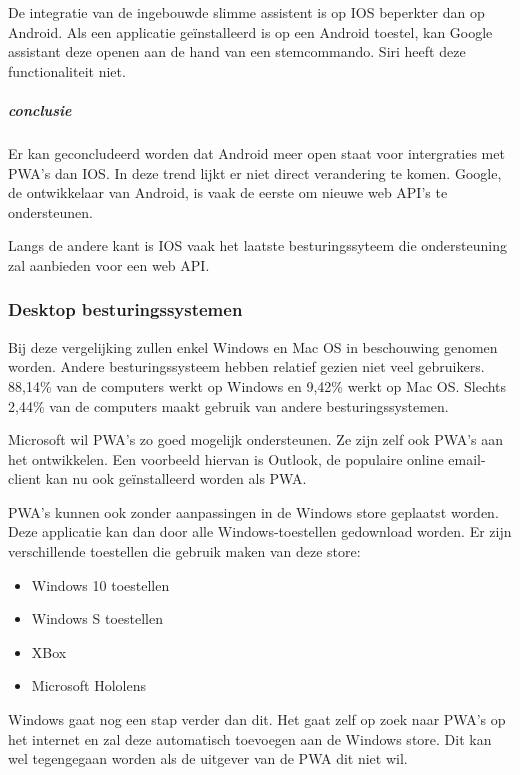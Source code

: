 	De integratie van de ingebouwde slimme assistent is op IOS beperkter dan op Android. Als een applicatie geïnstalleerd is op een Android toestel, kan Google assistant deze openen aan de hand van een stemcommando. Siri heeft deze functionaliteit niet.
	\autocite{Lathiya2020}
	
	\subparagraph{conclusie}
	
		Er kan geconcludeerd worden dat Android meer open staat voor intergraties met PWA's dan IOS. In deze trend lijkt er niet direct verandering te komen. Google, de ontwikkelaar van Android, is vaak de eerste om nieuwe web API's te ondersteunen.
		
		Langs de andere kant is IOS vaak het laatste besturingssyteem die ondersteuning zal aanbieden voor een web API.


\subsubsection{Desktop besturingssystemen}
	Bij deze vergelijking zullen enkel Windows en Mac OS in beschouwing genomen worden. Andere besturingssysteem hebben relatief gezien niet veel gebruikers. 88,14\% van de computers werkt op Windows en 9,42\% werkt op Mac OS. Slechts 2,44\% van de computers maakt gebruik van andere besturingssystemen.
	\autocite{netMarketShare2020}
	
	Microsoft wil PWA's zo goed mogelijk ondersteunen. Ze zijn zelf ook PWA's aan het ontwikkelen. Een voorbeeld hiervan is Outlook, de populaire online email-client kan nu ook geïnstalleerd worden als PWA.
	\autocite{Microsoft2020a}
	
	PWA's kunnen ook zonder aanpassingen in de Windows store geplaatst worden. Deze applicatie kan dan door alle Windows-toestellen gedownload worden. Er zijn verschillende toestellen die gebruik maken van deze store:
	\begin{itemize}
		\item	Windows 10 toestellen
		\item	Windows S toestellen
		\item	XBox
		\item	Microsoft Hololens 
	\end{itemize}
	
	Windows gaat nog een stap verder dan dit. Het gaat zelf op zoek naar PWA's op het internet en zal deze automatisch toevoegen aan de Windows store. Dit kan wel tegengegaan worden als de uitgever van de PWA dit niet wil.
	\autocite{Gustafson2017} \autocite{Gustafson2017a}
	
